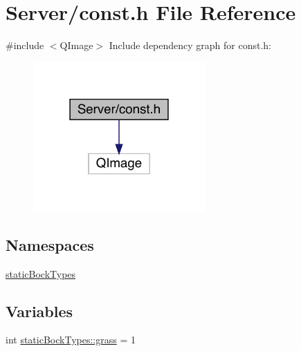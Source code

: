 \hypertarget{a00086}{}\section{Server/const.h File Reference}
\label{a00086}
{\ttfamily \#include $<$Q\+Image$>$}\newline
Include dependency graph for const.\+h\+:
\nopagebreak
\begin{figure}[H]
\begin{center}
\leavevmode
\includegraphics[width=186pt]{d1/d1e/a00087}
\end{center}
\end{figure}
\subsection*{Namespaces}
\begin{DoxyCompactItemize}
\item 
 \hyperlink{a00116}{static\+Bock\+Types}
\end{DoxyCompactItemize}
\subsection*{Variables}
\begin{DoxyCompactItemize}
\item 
int \hyperlink{a00116_a6dfdff0673d9c105ab375a71621be666}{static\+Bock\+Types\+::grass} = 1
\end{DoxyCompactItemize}

